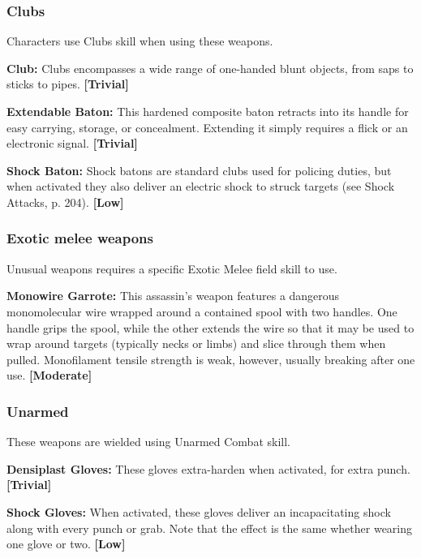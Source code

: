 \subsubsection{Clubs} 

Characters use Clubs skill when using these weapons. 

\textbf{Club:} Clubs encompasses a wide range of one-handed blunt objects, from saps to sticks to pipes. \textbf{[Trivial]} 

\textbf{Extendable Baton:} This hardened composite baton retracts into its handle for easy carrying, storage, or concealment. Extending it simply requires a flick or an electronic signal. \textbf{[Trivial]} 

\textbf{Shock Baton:} Shock batons are standard clubs used for policing duties, but when activated they also deliver an electric shock to struck targets (see Shock Attacks, p. 204). \textbf{[Low]} 

\subsubsection{Exotic melee weapons} 

Unusual weapons requires a specific Exotic Melee field skill to use. 

\textbf{Monowire Garrote:} This assassin’s weapon features a dangerous monomolecular wire wrapped around a contained spool with two handles. One handle grips the spool, while the other extends the wire so that it may be used to wrap around targets (typically necks or limbs) and slice through them when pulled. Monofilament tensile strength is weak, however, usually breaking after one use. \textbf{[Moderate]} 

\subsubsection{Unarmed} 

These weapons are wielded using Unarmed Combat skill. 

\textbf{Densiplast Gloves:} These gloves extra-harden when activated, for extra punch. \textbf{[Trivial]} 

\textbf{Shock Gloves:} When activated, these gloves deliver an incapacitating shock along with every punch or grab. Note that the effect is the same whether wearing one glove or two. \textbf{[Low]} 







